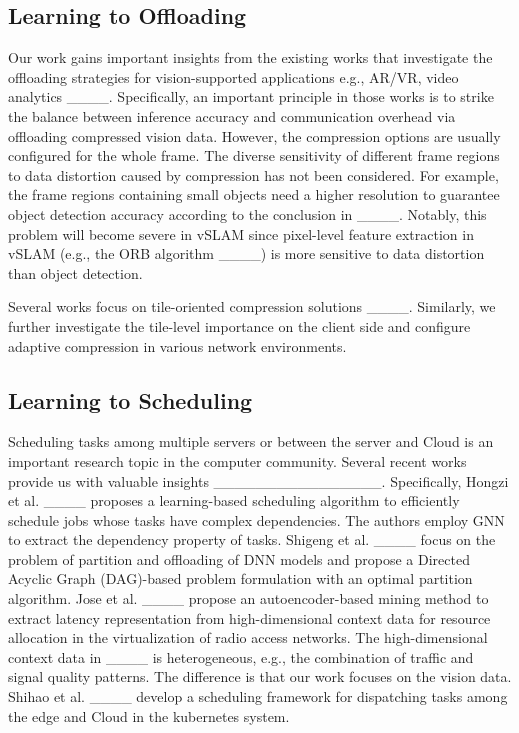 \subsection{Learning to Offloading} 
Our work gains important insights from the existing works that investigate the offloading strategies for vision-supported applications e.g., AR/VR, video analytics ____. Specifically, an important principle in those works is to strike the balance between inference accuracy and communication overhead via offloading compressed vision data. However, the compression options are usually configured for the whole frame. The diverse sensitivity of different frame regions to data distortion caused by compression has not been considered. For example, the frame regions containing small objects need a higher resolution to guarantee object detection accuracy according to the conclusion in ____. Notably, this problem will become severe in vSLAM since pixel-level feature extraction in vSLAM (e.g., the ORB algorithm ____) is more sensitive to data distortion than object detection. 

Several works focus on tile-oriented compression solutions ____. Similarly, we further investigate the tile-level importance on the client side and configure adaptive compression in various network environments.
 
\subsection{Learning to Scheduling} 
Scheduling tasks among multiple servers or between the server and Cloud is an important research topic in the computer community. Several recent works provide us with valuable insights ________________. Specifically, Hongzi et al. ____ proposes a learning-based scheduling algorithm to efficiently schedule jobs whose tasks have complex dependencies. The authors employ GNN to extract the dependency property of tasks. Shigeng et al. ____ focus on the problem of partition and offloading of DNN models and propose a Directed Acyclic Graph (DAG)-based problem formulation with an optimal partition algorithm. Jose et al. ____ propose an autoencoder-based mining method to extract latency representation from high-dimensional context data for resource allocation in the virtualization of radio access networks. The high-dimensional context data in ____ is heterogeneous, e.g., the combination of traffic and signal quality patterns. The difference is that our work focuses on the vision data. Shihao et al. ____ develop a scheduling framework for dispatching tasks among the edge and Cloud in the kubernetes system. 

